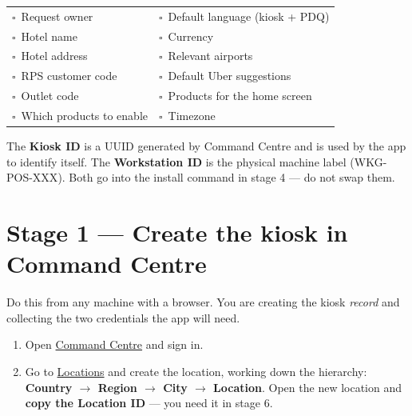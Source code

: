 \documentclass[a4paper,10pt]{article}
\newcommand{\wpath}[1]{{\ttfamily\small #1}}
\newcommand{\emptybox}{{\color{weknowgreyM}$\square$}}
\begin{document}
\begin{center}
\renewcommand{\arraystretch}{1.25}\small
\begin{tabularx}{\textwidth}{X X}
\rowcolor{weknowgreyL}
\emptybox\ Request owner & \emptybox\ Default language (kiosk + PDQ)\\
\emptybox\ Hotel name & \emptybox\ Currency\\
\rowcolor{weknowgreyL}
\emptybox\ Hotel address & \emptybox\ Relevant airports\\
\emptybox\ RPS customer code & \emptybox\ Default Uber suggestions\\
\rowcolor{weknowgreyL}
\emptybox\ Outlet code & \emptybox\ Products for the home screen\\
\emptybox\ Which products to enable & \emptybox\ Timezone\\
\end{tabularx}
\end{center}

\begin{wkwarn}
The \textbf{Kiosk ID} is a UUID generated by Command Centre and is used by
the app to identify itself. The \textbf{Workstation ID} is the physical
machine label (\wpath{WKG-POS-XXX}). Both go into the install command in
stage 4 --- do not swap them.
\end{wkwarn}

\clearpage
\section{Stage 1 --- Create the kiosk in Command Centre}\label{sec:cc}

Do this from any machine with a browser. You are creating the kiosk
\emph{record} and collecting the two credentials the app will need.

\begin{enumerate}
  \item Open \href{https://command.weknow.technology}{Command Centre}
        and sign in.

  \item Go to \href{https://command.weknow.technology/locations}{Locations}
        and create the location, working down the hierarchy:
        \textbf{Country $\rightarrow$ Region $\rightarrow$ City $\rightarrow$
        Location}. Open the new location and \textbf{copy the Location ID}
        --- you need it in stage 6.
\end{enumerate}
\end{document}
